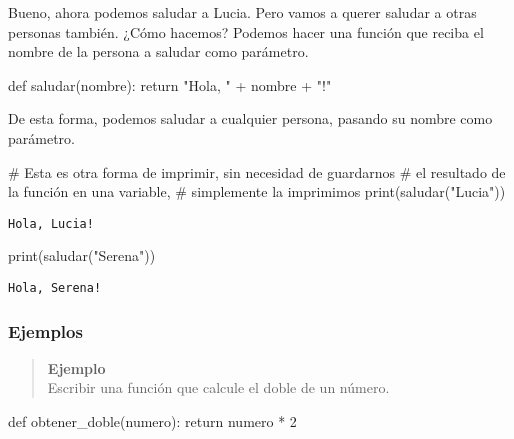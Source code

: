 \documentclass[
  letterpaper,
  DIV=11,
  numbers=noendperiod]{scrreprt}
\newenvironment{Shaded}{\begin{snugshade}}{\end{snugshade}}
\newcommand{\BuiltInTok}[1]{\textcolor[rgb]{0.00,0.23,0.31}{#1}}
\newcommand{\CommentTok}[1]{\textcolor[rgb]{0.37,0.37,0.37}{#1}}
\newcommand{\ControlFlowTok}[1]{\textcolor[rgb]{0.00,0.23,0.31}{#1}}
\newcommand{\DecValTok}[1]{\textcolor[rgb]{0.68,0.00,0.00}{#1}}
\newcommand{\KeywordTok}[1]{\textcolor[rgb]{0.00,0.23,0.31}{#1}}
\newcommand{\NormalTok}[1]{\textcolor[rgb]{0.00,0.23,0.31}{#1}}
\newcommand{\OperatorTok}[1]{\textcolor[rgb]{0.37,0.37,0.37}{#1}}
\newcommand{\StringTok}[1]{\textcolor[rgb]{0.13,0.47,0.30}{#1}}
\begin{document}
Bueno, ahora podemos saludar a Lucia. Pero vamos a querer saludar a
otras personas también. ¿Cómo hacemos? Podemos hacer una función que
reciba el nombre de la persona a saludar como parámetro.

\begin{Shaded}
\begin{Highlighting}[]
\KeywordTok{def}\NormalTok{ saludar(nombre):}
  \ControlFlowTok{return} \StringTok{"Hola, "} \OperatorTok{+}\NormalTok{ nombre }\OperatorTok{+} \StringTok{"!"}
\end{Highlighting}
\end{Shaded}

De esta forma, podemos saludar a cualquier persona, pasando su nombre
como parámetro.

\begin{Shaded}
\begin{Highlighting}[]
\CommentTok{\# Esta es otra forma de imprimir, sin necesidad de guardarnos}
\CommentTok{\# el resultado de la función en una variable,}
\CommentTok{\# simplemente la imprimimos}
\BuiltInTok{print}\NormalTok{(saludar(}\StringTok{"Lucia"}\NormalTok{))}
\end{Highlighting}
\end{Shaded}

\begin{verbatim}
Hola, Lucia!
\end{verbatim}

\begin{Shaded}
\begin{Highlighting}[]
\BuiltInTok{print}\NormalTok{(saludar(}\StringTok{"Serena"}\NormalTok{))}
\end{Highlighting}
\end{Shaded}

\begin{verbatim}
Hola, Serena!
\end{verbatim}

\subsubsection{Ejemplos}\label{ejemplos}

\begin{quote}
\textbf{Ejemplo}\\
Escribir una función que calcule el doble de un número.
\end{quote}

\begin{Shaded}
\begin{Highlighting}[]
\KeywordTok{def}\NormalTok{ obtener\_doble(numero):}
  \ControlFlowTok{return}\NormalTok{ numero }\OperatorTok{*} \DecValTok{2}
\end{Highlighting}
\end{Shaded}
\end{document}

